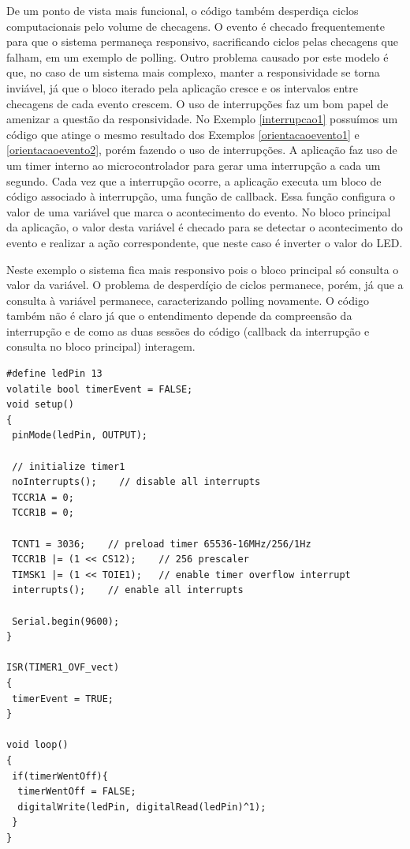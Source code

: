 \documentclass{article}
\begin{document}
\par De um ponto de vista mais funcional, o código também desperdiça ciclos computacionais pelo volume de checagens. O evento é checado frequentemente para que o sistema permaneça responsivo, sacrificando ciclos pelas checagens que falham, em um exemplo de polling. Outro problema causado por este modelo é que, no caso de um sistema mais complexo, manter a responsividade se torna inviável, já que o bloco iterado pela aplicação cresce e os intervalos entre checagens de cada evento crescem. O uso de interrupções faz um bom papel de amenizar a questão da responsividade. No Exemplo \ref{interrupcao1} possuímos um código que atinge o mesmo resultado dos Exemplos \ref{orientacaoevento1} e \ref{orientacaoevento2}, porém fazendo o uso de interrupções. A aplicação faz uso de um timer interno ao microcontrolador para gerar uma interrupção a cada um segundo. Cada vez que a interrupção ocorre, a aplicação executa um bloco de código associado à interrupção, uma função de callback. Essa função configura o valor de uma variável que marca o acontecimento do evento. No bloco principal da aplicação, o valor desta variável é checado para se detectar o acontecimento do evento e realizar a ação correspondente, que neste caso é inverter o valor do LED.
\par Neste exemplo o sistema fica mais responsivo pois o bloco principal só consulta o valor da variável. O problema de desperdíçio de ciclos permanece, porém, já que a consulta à variável permanece, caracterizando polling novamente. O código também não é claro já que o entendimento depende da compreensão da interrupção e de como as duas sessões do código (callback da interrupção e consulta no bloco principal) interagem.

\begin{lstlisting}[style=CStyle,label=interrupcao1,caption=Aplicação utilizando interrupção]
#define ledPin 13
volatile bool timerEvent = FALSE;
void setup()
{
 pinMode(ledPin, OUTPUT);

 // initialize timer1 
 noInterrupts();    // disable all interrupts
 TCCR1A = 0;
 TCCR1B = 0;

 TCNT1 = 3036;    // preload timer 65536-16MHz/256/1Hz
 TCCR1B |= (1 << CS12);    // 256 prescaler 
 TIMSK1 |= (1 << TOIE1);   // enable timer overflow interrupt
 interrupts();    // enable all interrupts
  
 Serial.begin(9600);
}

ISR(TIMER1_OVF_vect)
{
 timerEvent = TRUE;
}

void loop()
{
 if(timerWentOff){
  timerWentOff = FALSE;
  digitalWrite(ledPin, digitalRead(ledPin)^1);
 }
}
\end{lstlisting}
\end{document}
